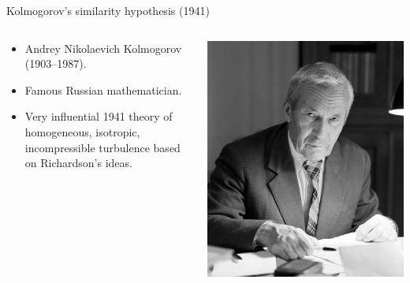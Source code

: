 \begin{frame}{Kolmogorov's similarity hypothesis (1941)}
  
\setlength{\fboxsep}{0pt}
\setlength{\fboxrule}{1pt}
\begin{columns}[T]
    \begin{column}{.58\textwidth}
    	\begin{itemize}
    		\item Andrey Nikolaevich Kolmogorov (1903--1987).
    		\item Famous Russian mathematician.
    		\item Very influential 1941 theory of homogeneous, isotropic, incompressible turbulence based on Richardson's ideas.
    	\end{itemize}	
    \end{column}
    \begin{column}{.42\textwidth}
    	\begin{minipage}[c][.5\textheight][c]{\linewidth}
    		\includegraphics[width=\textwidth]{kolmogorov.jpg}
    	\end{minipage}
    \end{column}
  \end{columns}
\end{frame}

